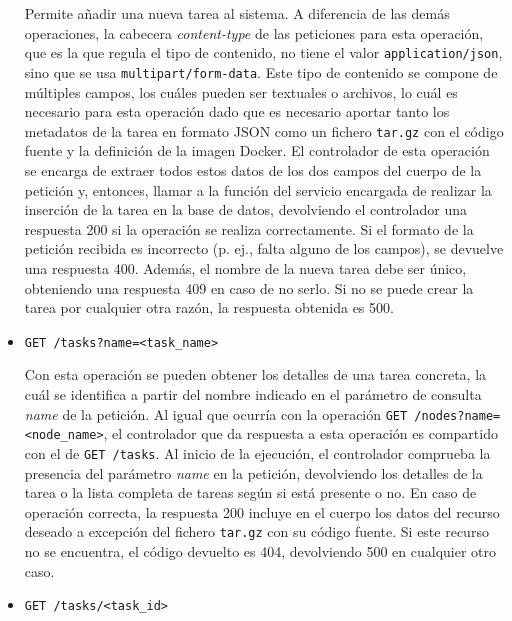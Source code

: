 \begin{itemize}
          Permite añadir una nueva tarea al sistema. A diferencia de las demás
          operaciones, la cabecera \textit{content-type} de las peticiones para
          esta operación, que es la que regula el tipo de contenido, no tiene el
          valor \texttt{application/json}, sino que se usa
          \texttt{multipart/form-data}. Este tipo de contenido se compone de
          múltiples campos, los cuáles pueden ser textuales o archivos, lo cuál
          es necesario para esta operación dado que es necesario aportar tanto
          los metadatos de la tarea en formato JSON como un fichero
          \texttt{tar.gz} con el código fuente y la definición de la imagen
          Docker. El controlador de esta operación se encarga de extraer todos
          estos datos de los dos campos del cuerpo de la petición y, entonces,
          llamar a la función del servicio encargada de realizar la inserción de
          la tarea en la base de datos, devolviendo el controlador una respuesta
          200 si la operación se realiza correctamente. Si el formato de la
          petición recibida es incorrecto (p. ej., falta alguno de los campos),
          se devuelve una respuesta 400. Además, el nombre de la nueva tarea
          debe ser único, obteniendo una respuesta 409 en caso de no serlo. Si
          no se puede crear la tarea por cualquier otra razón, la respuesta
          obtenida es 500.

    \item \texttt{GET /tasks?name=<task\_name>}

          Con esta operación se pueden obtener los detalles de una tarea
          concreta, la cuál se identifica a partir del nombre indicado en el
          parámetro de consulta \textit{name} de la petición. Al igual que
          ocurría con la operación \texttt{GET /nodes?name=<node\_name>}, el
          controlador que da respuesta a esta operación es compartido con el de
          \texttt{GET /tasks}. Al inicio de la ejecución, el controlador
          comprueba la presencia del parámetro \textit{name} en la petición,
          devolviendo los detalles de la tarea o la lista completa de tareas
          según si está presente o no. En caso de operación correcta, la
          respuesta 200 incluye en el cuerpo los datos del recurso deseado a
          excepción del fichero \texttt{tar.gz} con su código fuente. Si este
          recurso no se encuentra, el código devuelto es 404, devolviendo 500 en
          cualquier otro caso.

    \item \texttt{GET /tasks/<task\_id>}


\end{itemize}
